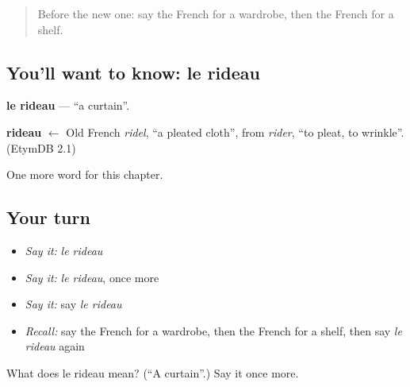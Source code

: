 \label{lesson:FR-C112-rideau}



\begin{quote}
Before the new one: say the French for a wardrobe, then the French for a shelf.
\end{quote}

\subsection*{You'll want to know: le rideau}
\textbf{le rideau} — \textquotedblleft{}a curtain\textquotedblright{}.

\begin{cousinweb}
\textbf{rideau} $\leftarrow$ Old French \emph{ridel}, \textquotedblleft{}a pleated cloth\textquotedblright{}, from \emph{rider}, \textquotedblleft{}to pleat, to wrinkle\textquotedblright{}. (EtymDB 2.1)
\end{cousinweb}

\begin{grammarlens}[title={What you've built}]
One more word for this chapter.
\end{grammarlens}

\subsection*{Your turn}
\begin{itemize}
\raggedright
  \item \emph{Say it:} \emph{le rideau}
  \item \emph{Say it:} \emph{le rideau}, once more
  \item \emph{Say it:} say \emph{le rideau}
  \item \emph{Recall:} say the French for a wardrobe, then the French for a shelf, then say \emph{le rideau} again
\end{itemize}

\begin{tcolorbox}[breakable,colback=teal!4,colframe=teal!35!black,title={Before you move on}]
What does le rideau mean? (\textquotedblleft{}A curtain\textquotedblright{}.) Say it once more.
\end{tcolorbox}
